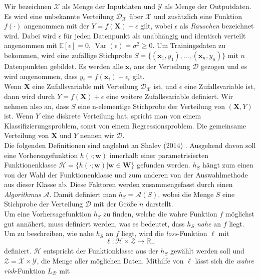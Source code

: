 Wir bezeichnen $\mathcal{X}$ als Menge der Inputdaten und $\mathcal{Y}$ als Menge der Outputdaten. Es wird eine unbekannte Verteilung $\mathcal{D_X}$ \"uber
$\mathcal{X}$ und zus\"atzlich eine Funktion $f(\cdot)$ angenommen mit der $Y = f(\mathbf{X}) + \epsilon$ gilt, wobei $\epsilon$ als \textit{Rauschen} bezeichnet wird.
Dabei wird $\epsilon$ f\"ur jeden Datenpunkt als unabh\"angig und identisch verteilt angenommen mit
$\mathbb{E}[\epsilon] = 0$, $\operatorname{Var}(\epsilon) = \sigma^2 \geq 0$.
Um Trainingsdaten zu bekommen, wird eine zuf\"allige Stichprobe $S = \{(\mathbf{x}_1, y_1), \dots ,
	(\mathbf{x}_n, y_n)\}$ mit $n$ Datenpunkten gebildet. Es werden alle $\mathbf{x}_i$ aus der Verteilung $\mathcal{D}$ gezogen und es wird
angenommen, dass $y_i = f(\mathbf{x}_i) + \epsilon_i $ gilt. \\


Wenn $\mathbf{X}$ eine Zufallsvariable mit Verteilung $\mathcal{D}_{\mathcal{X}}$ ist, und $\epsilon$ eine Zufallsvariable ist, dann wird durch
$Y = f(\mathbf{X}) + \epsilon$ eine weitere Zufallsvariable definiert. Wir nehmen also an, dass $S$ eine n-elementige Stichprobe der Verteilung
von $(\mathbf{X},Y)$ ist. Wenn $Y$ eine diskrete Verteilung hat, spricht man von einem Klassifizierungsproblem, sonst von einem Regressionsproblem.
Die gemeinsame Verteilung von $\mathbf{X}$ und $Y$ nennen wir $\mathcal{D}$.\\


Die folgenden Definitionen sind anglehnt an Shalev (2014) \cite[Seiten 33 bis 35]{shalev}.
Ausgehend davon soll eine Vorhersagefunktion $h(\cdot;\mathbf{w})$ innerhalb einer parametrisierten Funktionenklasse $\mathcal{H} = \{ h(\cdot; \mathbf{w})
	|\mathbf{w} \in \mathbf{W}\}$ gefunden werden. $h_S$ h\"angt zum einen von der Wahl der Funktionenklasse und zum anderen von der Auswahlmethode aus dieser Klasse ab.
Diese Faktoren werden zusammengefasst durch einen \textit{Algorithmus} $\mathcal{A}$. Damit definiert man $h_S = \mathcal{A}(S)$, wobei die Menge $S$ eine
Stichprobe der Verteilung $\mathcal{D}$ mit der Gr\"o{\ss}e $n$ darstellt. \\


Um eine Vorhersagefunktion $h_S$ zu finden, welche die wahre Funktion $f$ m\"oglichst gut ann\"ahert, muss definiert werden, was es bedeutet, dass
$h_S$ \textit{nahe} an $f$ liegt. 
Um zu beschreiben, wie nahe $h_S$ an $f$ liegt, wird die \textit{loss}-Funktion $\ell$ mit
$$ \ell : \mathcal{H} \times \mathcal{Z} \to \mathbb{R}_+ $$
definiert. $\mathcal{H}$ entspricht der Funktionklasse aus der $h_S$ gew\"ahlt werden soll und $\mathcal{Z} =
	\mathcal{X} \times \mathcal{Y}$, die Menge aller m\"oglichen Daten. Mithilfe von $\ell$ l\"asst sich die \textit{wahre risk}-Funktion $L_{\mathcal{D}}$ mit

